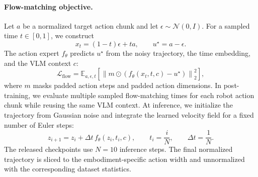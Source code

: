 \paragraph{Flow-matching objective.}
Let \(a\) be a normalized target action chunk and let
\(\epsilon \sim \mathcal{N}(0,I)\). For a sampled time \(t \in [0,1]\), we
construct
\begin{equation}
    x_t = (1-t)\epsilon + t a,
    \qquad
    u^\star = a - \epsilon .
\end{equation}
The action expert \(f_\theta\) predicts \(u^\star\) from the noisy trajectory,
the time embedding, and the VLM context \(c\):
\begin{equation}
    \mathcal{L}_{\mathrm{flow}}
    =
    \mathbb{E}_{a,\epsilon,t}
    \left[
    \left\|
    m \odot \left(f_\theta(x_t,t,c) - u^\star\right)
    \right\|_2^2
    \right],
\end{equation}
where \(m\) masks padded action steps and padded action dimensions. In
post-training, we evaluate multiple sampled flow-matching times for each robot
action chunk while reusing the same VLM context. At inference, we initialize
the trajectory from Gaussian noise and integrate the learned velocity field for
a fixed number of Euler steps:
\begin{equation}
    z_{i+1} = z_i + \Delta t \, f_\theta(z_i,t_i,c),
    \qquad
    t_i = \frac{i}{N},
    \qquad
    \Delta t = \frac{1}{N}.
\end{equation}
The released checkpoints use \(N=10\) inference steps. The final normalized
trajectory is sliced to the embodiment-specific action width and unnormalized
with the corresponding dataset statistics.

